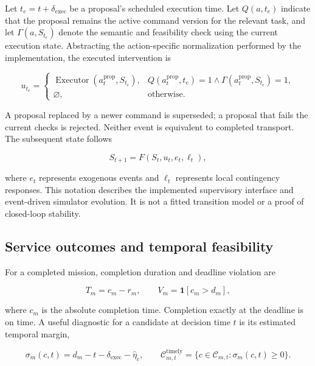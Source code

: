 \documentclass[]{interact}
\theoremstyle{plain}
\theoremstyle{definition}
\theoremstyle{remark}
\begin{document}
Let $t_e=t+\delta_{\mathrm{exec}}$ be a proposal's scheduled execution time. Let $Q(a,t_e)$ indicate that the proposal remains the active command version for the relevant task, and let $\Gamma(a,S_{t_e})$ denote the semantic and feasibility check using the current execution state. Abstracting the action-specific normalization performed by the implementation, the executed intervention is

\begin{equation*}
u_{t_e}=\begin{cases}
\operatorname{Executor}(a_t^{\mathrm{prop}},S_{t_e}),
&Q(a_t^{\mathrm{prop}},t_e)=1\land\Gamma(a_t^{\mathrm{prop}},S_{t_e})=1,\\
\varnothing,&\text{otherwise}.
\end{cases} \tag{5}
\end{equation*}

A proposal replaced by a newer command is superseded; a proposal that fails the current checks is rejected. Neither event is equivalent to completed transport. The subsequent state follows

\begin{equation*}
S_{t+1}=F(S_t,u_t,e_t,\ell_t), \tag{6}
\end{equation*}

where $e_t$ represents exogenous events and $\ell_t$ represents local contingency responses. This notation describes the implemented supervisory interface and event-driven simulator evolution. It is not a fitted transition model or a proof of closed-loop stability.

\subsection{Service outcomes and temporal feasibility}

For a completed mission, completion duration and deadline violation are

\begin{equation*}
T_m=c_m-r_m,\qquad V_m=\mathbf1[c_m>d_m], \tag{7}
\end{equation*}

where $c_m$ is the absolute completion time. Completion exactly at the deadline is on time. A useful diagnostic for a candidate at decision time $t$ is its estimated temporal margin,

\begin{equation*}
\sigma_m(c,t)=d_m-t-\delta_{\mathrm{exec}}-\widehat\eta_c,\qquad
\mathcal C^{\mathrm{timely}}_{m,t}=\{c\in\mathcal C_{m,t}:\sigma_m(c,t)\ge0\}. \tag{8}
\end{equation*}
\end{document}
